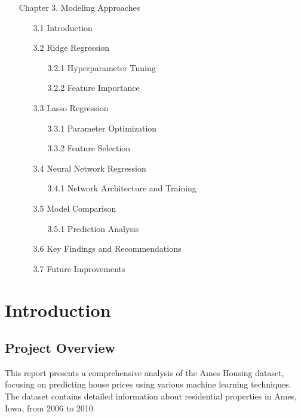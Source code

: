 \documentclass[12pt]{report}
\begin{document}
\begin{itemize}
\item[Chapter 3.] Modeling Approaches
    \begin{itemize}
    \item[3.1] Introduction
    \item[3.2] Ridge Regression
        \begin{itemize}
        \item[3.2.1] Hyperparameter Tuning
        \item[3.2.2] Feature Importance
        \end{itemize}
    \item[3.3] Lasso Regression
        \begin{itemize}
        \item[3.3.1] Parameter Optimization
        \item[3.3.2] Feature Selection
        \end{itemize}
    \item[3.4] Neural Network Regression
        \begin{itemize}
        \item[3.4.1] Network Architecture and Training
        \end{itemize}
    \item[3.5] Model Comparison
        \begin{itemize}
        \item[3.5.1] Prediction Analysis
        \end{itemize}
    \item[3.6] Key Findings and Recommendations
    \item[3.7] Future Improvements
    \end{itemize}
\end{itemize}

\chapter{Introduction}

\section{Project Overview}
This report presents a comprehensive analysis of the Ames Housing dataset, focusing on predicting house prices using various machine learning techniques. The dataset contains detailed information about residential properties in Ames, Iowa, from 2006 to 2010.
\end{document}
